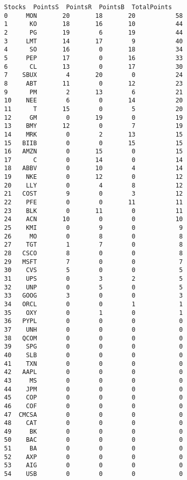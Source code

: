 \documentclass[11pt]{article}
\makeatletter
\newcommand{\boxspacing}{\kern\kvtcb@left@rule\kern\kvtcb@boxsep}
\newcommand{\prompt}[4]{
        {\ttfamily\llap{{\color{#2}[#3]:\hspace{3pt}#4}}\vspace{-\baselineskip}}
    }
\makeatother
\begin{document}
            \begin{tcolorbox}[breakable, size=fbox, boxrule=.5pt, pad at break*=1mm, opacityfill=0]
\prompt{Out}{outcolor}{30}{\boxspacing}
\begin{Verbatim}[commandchars=\\\{\}]
   Stocks  PointsS  PointsR  PointsB  TotalPoints
0     MON       20       18       20           58
1      KO       18       16       10           44
2      PG       19        6       19           44
3     LMT       14       17        9           40
4      SO       16        0       18           34
5     PEP       17        0       16           33
6      CL       13        0       17           30
7    SBUX        4       20        0           24
8     ABT       11        0       12           23
9      PM        2       13        6           21
10    NEE        6        0       14           20
11      T       15        0        5           20
12     GM        0       19        0           19
13    BMY       12        0        7           19
14    MRK        0        2       13           15
15   BIIB        0        0       15           15
16   AMZN        0       15        0           15
17      C        0       14        0           14
18   ABBV        0       10        4           14
19    NKE        0       12        0           12
20    LLY        0        4        8           12
21   COST        9        0        3           12
22    PFE        0        0       11           11
23    BLK        0       11        0           11
24    ACN       10        0        0           10
25    KMI        0        9        0            9
26     MO        0        8        0            8
27    TGT        1        7        0            8
28   CSCO        8        0        0            8
29   MSFT        7        0        0            7
30    CVS        5        0        0            5
31    UPS        0        3        2            5
32    UNP        0        5        0            5
33   GOOG        3        0        0            3
34   ORCL        0        0        1            1
35    OXY        0        1        0            1
36   PYPL        0        0        0            0
37    UNH        0        0        0            0
38   QCOM        0        0        0            0
39    SPG        0        0        0            0
40    SLB        0        0        0            0
41    TXN        0        0        0            0
42   AAPL        0        0        0            0
43     MS        0        0        0            0
44    JPM        0        0        0            0
45    COP        0        0        0            0
46    COF        0        0        0            0
47  CMCSA        0        0        0            0
48    CAT        0        0        0            0
49     BK        0        0        0            0
50    BAC        0        0        0            0
51     BA        0        0        0            0
52    AXP        0        0        0            0
53    AIG        0        0        0            0
54    USB        0        0        0            0
\end{Verbatim}
\end{tcolorbox}
        
\end{document}
